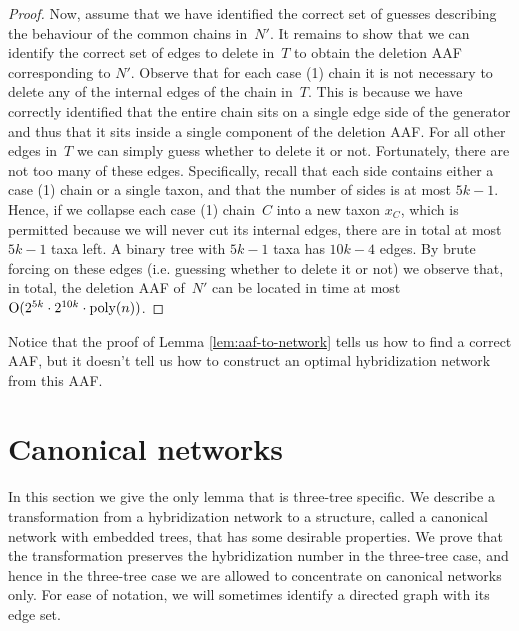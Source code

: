 \begin{proof}
Now, assume that we have identified the correct set of guesses describing the behaviour of the common chains in~$N'$. It remains to show that we can identify the correct set of edges to delete in~$T$ to obtain the deletion AAF corresponding to $N'$. Observe that for each case (1) chain it is not necessary to delete any of the internal edges of the chain in~$T$. This is because we have correctly identified that the entire chain sits on a single edge side of the generator and thus that it sits inside a single component of the deletion AAF. For all other edges in~$T$ we can simply guess whether to delete it or not. Fortunately, there are not too many of these edges. Specifically, recall that each side contains either a case (1) chain or a single taxon, and that the number of sides is at most $5k-1$. Hence, if we collapse each case (1) chain~$C$ into a new taxon $x_{C}$, which is permitted because we will never cut its internal edges, there are in total at most $5k - 1$ taxa left. A binary tree with $5k-1$ taxa has $10k - 4$ edges. By brute forcing on these edges (i.e. guessing whether to delete it or not) we observe that, in total, the deletion AAF of~$N'$ can be located in time at most $\mathrm{O}(2^{5k} \cdot 2^{10k} \cdot \text{poly}(n))$.
\end{proof}

Notice that the proof of Lemma \ref{lem:aaf-to-network} tells us how to find a correct AAF, but it doesn't tell us how to construct an optimal hybridization network from this AAF.

\section{Canonical networks}

\label{sec:network-to-canonical-network}

In this section we give the only lemma that is three-tree specific. We describe a transformation from a hybridization network to a structure, called a canonical network with embedded trees, that has some desirable properties. We prove that the transformation preserves the hybridization number in the three-tree case, and hence in the three-tree case we are allowed to concentrate on canonical networks only. {For ease of notation, we will sometimes identify a directed graph with its edge set.}

